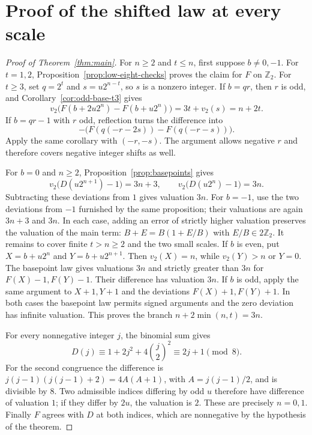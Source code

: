 \documentclass[11pt]{article}
\theoremstyle{remark}\newtheorem{remark}[theorem]{Remark}
\newcommand{\Ztwo}{\mathbb Z_2}\newcommand{\Qtwo}{\mathbb Q_2}
\begin{document}
\section{Proof of the shifted law at every scale}
\begin{proof}[Proof of Theorem~\ref{thm:main}]
For $n\ge2$ and $t\le n$, first suppose $b\ne0,-1$.
For $t=1,2$, Proposition~\ref{prop:low-eight-checks} proves the claim
for $F$ on $\Ztwo$. For $t\ge3$, set $q=2^t$ and
$s=u2^{n-t}$, so $s$ is a nonzero integer.
If $b=qr$, then $r$ is odd, and Corollary~\ref{cor:odd-base-t3} gives
\[
v_2\bigl(F(b+2u2^n)-F(b+u2^n)\bigr)
=3t+v_2(s)=n+2t.
\]
If $b=qr-1$ with $r$ odd, reflection turns the difference into
\[
-\bigl(F(q(-r-2s))-F(q(-r-s))\bigr).
\]
Apply the same corollary with $(-r,-s)$. The argument allows negative
$r$ and therefore covers negative integer shifts as well.

For $b=0$ and $n\ge2$, Proposition~\ref{prop:basepoints} gives
\[
v_2\bigl(D(u2^{n+1})-1\bigr)=3n+3,
\qquad
v_2\bigl(D(u2^n)-1\bigr)=3n.
\]
Subtracting these deviations from $1$ gives valuation $3n$.
For $b=-1$, use the two deviations from $-1$ furnished by the same
proposition; their valuations are again $3n+3$ and $3n$.
In each case, adding an error of strictly higher valuation preserves
the valuation of the main term: $B+E=B(1+E/B)$ with $E/B\in2\Ztwo$.
It remains to cover finite $t>n\ge2$ and the two small scales.
If $b$ is even, put $X=b+u2^n$ and $Y=b+u2^{n+1}$.
Then $v_2(X)=n$, while $v_2(Y)>n$ or $Y=0$.
The basepoint law gives valuations $3n$ and strictly greater than
$3n$ for $F(X)-1,F(Y)-1$. Their difference has valuation $3n$.
If $b$ is odd, apply the same argument to $X+1,Y+1$ and
the deviations $F(X)+1,F(Y)+1$. In both cases the basepoint
law permits signed arguments and the zero deviation has infinite
valuation. This proves the branch $n+2\min(n,t)=3n$.

For every nonnegative integer $j$, the binomial sum gives
\[
 D(j)\equiv1+2j^2+4\binom j2^2\equiv2j+1\pmod8.
\]
For the second congruence the difference is
$j(j-1)(j(j-1)+2)=4A(A+1)$, with $A=j(j-1)/2$, and is
divisible by $8$. Two admissible indices differing by odd $u$ therefore
have difference of valuation $1$; if they differ by $2u$, the valuation
is $2$. These are precisely $n=0,1$.
Finally $F$ agrees with $D$ at both indices, which are nonnegative
by the hypothesis of the theorem.
\end{proof}
\end{document}
